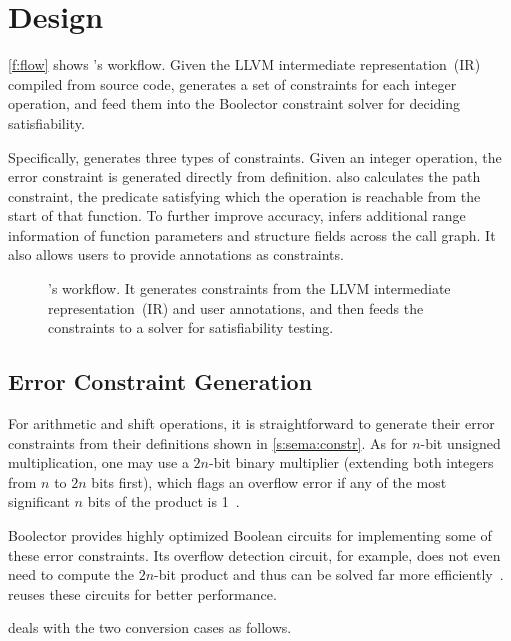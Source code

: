 \section{Design}
\label{s:gen}

\autoref{f:flow} shows \sys's workflow.  Given the LLVM intermediate
representation~(IR) compiled from source code, \sys generates a set
of constraints for each integer operation, and feed them into the
Boolector constraint solver for deciding satisfiability.

Specifically, \sys generates three types of constraints.
%
Given an integer operation, the error constraint is generated
directly from definition.
%
\sys also calculates the path constraint, the predicate satisfying
which the operation is reachable from the start of that function.
%
To further improve accuracy, \sys infers additional range information
of function parameters and structure fields across the call graph.
It also allows users to provide annotations as constraints.

\begin{figure}
\centering
\resizebox{\linewidth}{!}{

}
\caption{\sys's workflow.  It generates constraints from the LLVM
intermediate representation~(IR) and user annotations, and then feeds
the constraints to a solver for satisfiability testing.}
\label{f:flow}
\end{figure}

\subsection{Error Constraint Generation}

For arithmetic and shift operations, it is straightforward to
generate their error constraints from their definitions shown in
\autoref{s:sema:constr}.  As for $n$-bit unsigned multiplication,
one may use a $2n$-bit binary multiplier (extending both integers
from $n$ to $2n$ bits first), which flags an overflow error if any
of the most significant $n$ bits of the product is
1~\cite{molnar:catchconv}.

Boolector provides highly optimized Boolean circuits for implementing
some of these error constraints.  Its overflow detection circuit,
for example, does not even need to compute the $2n$-bit product and
thus can be solved far more
efficiently~\cite[\chapterautorefname~3.5]{brummayer:phd}.  \sys
reuses these circuits for better performance.

\sys deals with the two conversion cases as follows.

